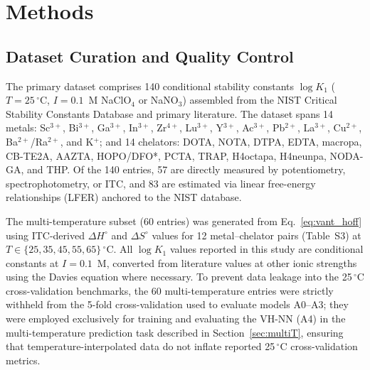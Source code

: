 \documentclass[journal=jacsat,manuscript=article]{achemso}
\begin{document}
\section{Methods}

\subsection{Dataset Curation and Quality Control}

The primary dataset comprises 140 conditional stability constants $\log K_1$
($T = 25\,^\circ$C, $I = 0.1$~M NaClO$_4$ or NaNO$_3$) assembled from the
NIST Critical Stability Constants Database\cite{MartellSmith2004} and primary
literature.
The dataset spans 14 metals:
Sc$^{3+}$,\cite{Pniok2014}
Bi$^{3+}$,\cite{Milne2015}
Ga$^{3+}$,\cite{Notni2010,Simecek2012}
In$^{3+}$,
Zr$^{4+}$,\cite{Deri2015,Boros2014}
Lu$^{3+}$,\cite{deLeonRodriguez2008}
Y$^{3+}$,
Ac$^{3+}$,\cite{Thiele2017}
Pb$^{2+}$,\cite{FerrandoCliment2022}
La$^{3+}$,\cite{RocaSabio2009}
Cu$^{2+}$,
Ba$^{2+}$/Ra$^{2+}$,\cite{Blei2023}
and K$^+$;
and 14 chelators: DOTA, NOTA, DTPA, EDTA, macropa,\cite{Blei2023,RocaSabio2009}
CB-TE2A, AAZTA,\cite{Baranyai2007}
HOPO/DFO*,\cite{Boros2014,Deri2015}
PCTA,\cite{Paurova2016} TRAP,\cite{Simecek2012}
H4octapa, H4neunpa, NODA-GA, and THP.
Of the 140 entries, 57 are directly measured by potentiometry, spectrophotometry,
or ITC, and 83 are estimated via linear free-energy relationships (LFER)
anchored to the NIST database.\cite{MartellSmith2004,Hancock1989}

The multi-temperature subset (60 entries) was generated from Eq.~\ref{eq:vant_hoff}
using ITC-derived $\Delta H^\circ$ and $\Delta S^\circ$ values for 12 metal--chelator
pairs (Table~S3)\cite{Leavitt2001} at
$T \in \{25, 35, 45, 55, 65\}\,^\circ$C.
All $\log K_1$ values reported in this study are conditional constants at $I = 0.1$~M,
converted from literature values at other ionic strengths using the Davies
equation where necessary.
To prevent data leakage into the 25\,$^\circ$C cross-validation benchmarks,
the 60 multi-temperature entries were strictly withheld from the 5-fold
cross-validation used to evaluate models A0--A3; they were employed exclusively
for training and evaluating the VH-NN (A4) in the multi-temperature prediction
task described in Section~\ref{sec:multiT}, ensuring that temperature-interpolated
data do not inflate reported 25\,$^\circ$C cross-validation metrics.
\end{document}
